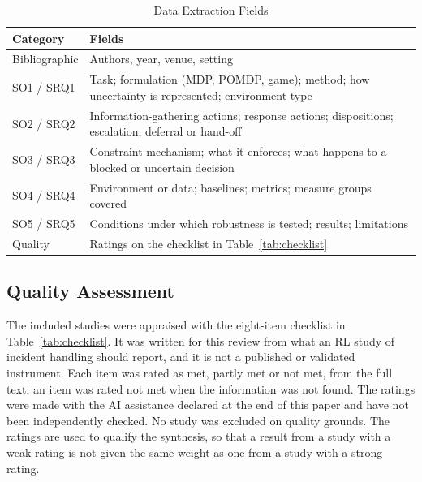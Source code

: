 \begin{table}[!t]
\centering
\caption{Data Extraction Fields}
\label{tab:extraction}
\footnotesize
\begin{tabularx}{\columnwidth}{@{}lL@{}}
\toprule
Category & Fields \\
\midrule
Bibliographic & Authors, year, venue, setting \\
SO1 / SRQ1 & Task; formulation (MDP, POMDP, game); method; how uncertainty is represented; environment type \\
SO2 / SRQ2 & Information-gathering actions; response actions; dispositions; escalation, deferral or hand-off \\
SO3 / SRQ3 & Constraint mechanism; what it enforces; what happens to a blocked or uncertain decision \\
SO4 / SRQ4 & Environment or data; baselines; metrics; measure groups covered \\
SO5 / SRQ5 & Conditions under which robustness is tested; results; limitations \\
Quality & Ratings on the checklist in Table~\ref{tab:checklist} \\
\bottomrule
\end{tabularx}
\end{table}

\subsection{Quality Assessment}

The included studies were appraised with the eight-item checklist in Table~\ref{tab:checklist}. It was written for this review from what an RL study of incident handling should report, and it is not a published or validated instrument. Each item was rated as met, partly met or not met, from the full text; an item was rated not met when the information was not found. The ratings were made with the AI assistance declared at the end of this paper and have not been independently checked. No study was excluded on quality grounds. The ratings are used to qualify the synthesis, so that a result from a study with a weak rating is not given the same weight as one from a study with a strong rating.

